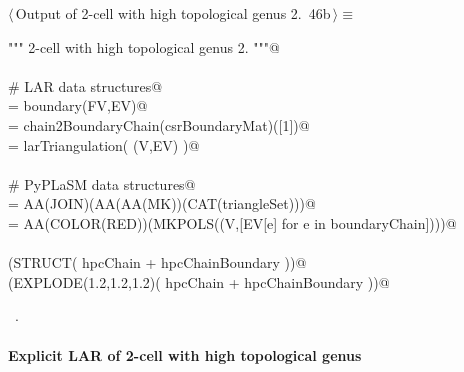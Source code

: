 \documentclass[11pt,oneside]{article}	%
\begin{document}
\begin{flushleft} \small \label{scrap77}
\protect{}$\langle\,$Output of 2-cell with high topological genus 2.\nobreak\ {\footnotesize 46b}$\,\rangle\equiv$
\vspace{-1ex}
\begin{list}{}{} \item
\mbox{}\verb@""" 2-cell with high topological genus 2. """@\\
\mbox{}\verb@@\\
\mbox{}\verb@# LAR data structures@\\
\mbox{}\verb@csrBoundaryMat = boundary(FV,EV)@\\
\mbox{}\verb@boundaryChain = chain2BoundaryChain(csrBoundaryMat)([1])@\\
\mbox{}\verb@triangleSet = larTriangulation( (V,EV) )@\\
\mbox{}\verb@@\\
\mbox{}\verb@# PyPLaSM data structures@\\
\mbox{}\verb@hpcChain = AA(JOIN)(AA(AA(MK))(CAT(triangleSet)))@\\
\mbox{}\verb@hpcChainBoundary = AA(COLOR(RED))(MKPOLS((V,[EV[e] for e in boundaryChain])))@\\
\mbox{}\verb@@\\
\mbox{}\verb@VIEW(STRUCT( hpcChain + hpcChainBoundary ))@\\
\mbox{}\verb@VIEW(EXPLODE(1.2,1.2,1.2)( hpcChain + hpcChainBoundary ))@\\
\mbox{}\verb@@{\NWsep}
\end{list}
\vspace{-1ex}
\footnotesize\addtolength{\baselineskip}{-1ex}
\begin{list}{}{\setlength{\itemsep}{-\parsep}\setlength{\itemindent}{-\leftmargin}}
\item \NWtxtMacroRefIn\ .
\end{list}
\end{flushleft}

\paragraph{Explicit LAR of 2-cell with high topological genus}
\end{document}
